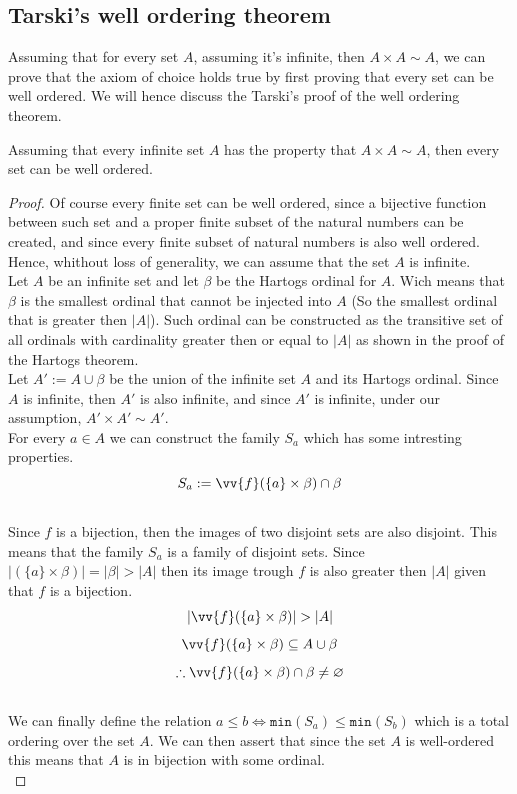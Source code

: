 
\subsection{Tarski's well ordering theorem}
Assuming that for every set $A$, assuming it's infinite, then $A \times A \sim A$, we can prove that the axiom of choice holds true by first 
proving that every set can be well ordered. We will hence discuss the Tarski's proof of the well ordering theorem.

\begin{theorem}
    Assuming that every infinite set $A$ has the property that $A \times A \sim A$, then every set can be well ordered.
\end{theorem}
\begin{proof}
    Of course every finite set can be well ordered, since a bijective function between such set and a proper finite subset of 
    the natural numbers can be created, and since every finite subset of natural numbers is also well ordered. Hence, whithout 
    loss of generality, we can assume that the set $A$ is infinite. \\

    Let $A$ be an infinite set and let $\beta$ be the Hartogs ordinal for $A$. Wich means that $\beta$ is the smallest ordinal
    that cannot be injected into $A$ (So the smallest ordinal that is greater then $|A|$). Such ordinal can be constructed 
    as the transitive set of all ordinals with cardinality greater then or equal to $|A|$ as shown in the proof of 
    the Hartogs theorem. \\

    Let $A' := A \cup \beta$ be the union of the infinite set $A$ and its Hartogs ordinal. Since $A$ is infinite, then $A'$ is
    also infinite, and since $A'$ is infinite, under our assumption, $A' \times A' \sim A'$. \\

    For every $a \in A$ we can construct the family $S_a$ which has some intresting properties. \\

    $$ S_a := \vv{f}(\{a\} \times \beta) \cap \beta $$ \\

    Since $f$ is a bijection, then the images of two disjoint sets are also disjoint. This 
    means that the family $S_a$ is a family of disjoint 
    sets. Since $|(\{a\} \times \beta)| = |\beta| > |A|$ then its image trough $f$ is also 
    greater then $|A|$ given that $f$ is a bijection. \\

    $$ |\vv{f}(\{a\} \times \beta)| > |A| $$
    $$ \vv{f}(\{a\} \times \beta) \subseteq A \cup \beta $$
    $$ \therefore \vv{f}(\{a\} \times \beta) \cap \beta \neq \varnothing $$ \\

    We can finally define the relation 
    $a \leq b \iff \texttt{min}(S_a) \leq \texttt{min}(S_b)$ which 
    is a total ordering over the set $A$. We can then assert that since the set $A$ is 
    well-ordered this means that $A$ is in bijection with some ordinal.  \\

\end{proof}